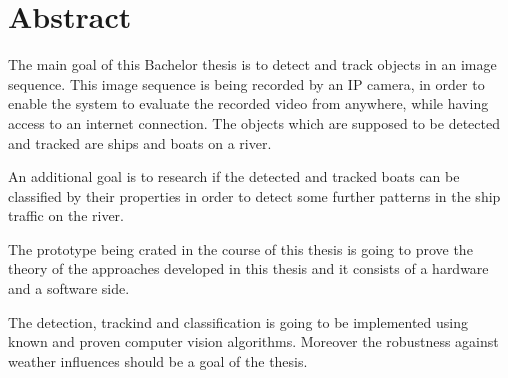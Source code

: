 \chapter{Abstract}
The main goal of this Bachelor thesis is to detect and track objects in an image sequence. This image sequence is being recorded by an IP camera, in order to enable the system to evaluate the recorded video from anywhere, while having access to an internet connection. The objects which are supposed to be detected and tracked are ships and boats on a river.

An additional goal is to research if the detected and tracked boats can be classified by their properties in order to detect some further patterns in the ship traffic on the river.

The prototype being crated in the course of this thesis is going to prove the theory of the approaches developed in this thesis and it consists of a hardware and a software side.

The detection, trackind and classification is going to be implemented using known and proven computer vision algorithms. Moreover the robustness against weather influences should be a goal of the thesis.